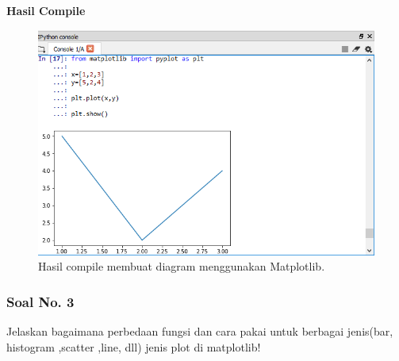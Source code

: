 \hfill \break
\textbf{Hasil Compile}

\begin{figure}[H]
	\includegraphics[width=12cm]{figures/6/1174089/Teori/2.png}
	\centering
	\caption{Hasil compile membuat diagram menggunakan Matplotlib.}
\end{figure}
 
\subsubsection{Soal No. 3}
\hfill \break
Jelaskan bagaimana perbedaan fungsi dan cara pakai untuk berbagai jenis(bar, histogram ,scatter ,line, dll) jenis plot di matplotlib!

